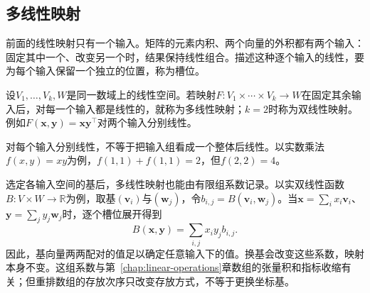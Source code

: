 \subsection{多线性映射}

前面的线性映射只有一个输入。矩阵的元素内积、两个向量的外积都有两个输入：固定其中一个、改变另一个时，结果保持线性组合。描述这种逐个输入的线性，要为每个输入保留一个独立的位置，称为槽位。

设$V_1,\ldots,V_k,W$是同一数域上的线性空间。若映射$F:V_1\times\cdots\times V_k\to W$在固定其余输入后，对每一个输入都是线性的，就称为多线性映射；$k=2$时称为双线性映射。例如$F(\bm x,\bm y)=\bm x\bm y^\top$对两个输入分别线性。

对每个输入分别线性，不等于把输入组看成一个整体后线性。以实数乘法$f(x,y)=xy$为例，$f(1,1)+f(1,1)=2$，但$f(2,2)=4$。

选定各输入空间的基后，多线性映射也能由有限组系数记录。以实双线性函数$B:V\times W\to\mathbb R$为例，取基$(\bm v_i)$与$(\bm w_j)$，令$b_{i,j}=B(\bm v_i,\bm w_j)$。当$\bm x=\sum_i x_i\bm v_i$、$\bm y=\sum_j y_j\bm w_j$时，逐个槽位展开得到
\[
 B(\bm x,\bm y)=\sum_{i,j}x_i y_j b_{i,j}.
\]
因此，基向量两两配对的值足以确定任意输入下的值。换基会改变这些系数，映射本身不变。这组系数与第~\ref{chap:linear-operations}章数组的张量积和指标收缩有关；但重排数组的存放次序只改变存放方式，不等于更换坐标基。
